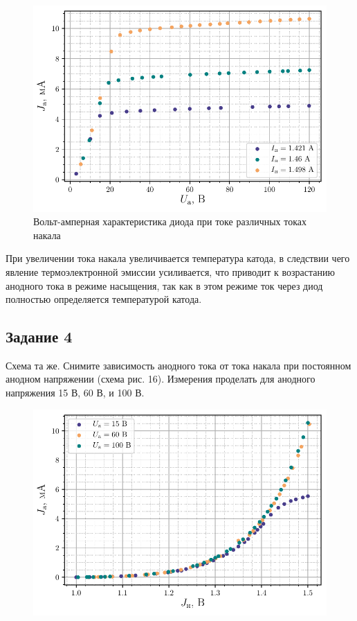 \begin{figure}[H]
	\centering
    \includegraphics[scale=1]{scripts/fig3}
	\caption{Вольт-амперная характеристика диода при токе различных токах
    накала}
	\label{fig:17}
\end{figure}

При увеличении тока накала увеличивается температура катода, в следствии чего явление термоэлектронной эмиссии усиливается, что приводит к возрастанию анодного тока в режиме насыщения, так как в этом режиме ток через диод полностью определяется температурой катода.

\subsection{Задание 4}
Схема та же. Снимите зависимость анодного тока от тока накала при постоянном анодном напряжении (схема рис. 16). Измерения проделать для анодного напряжения 15 В, 60 В, и 100 В.

\begin{figure}[H]
	\centering
    \includegraphics[width=0.85\linewidth]{scripts/fig4}
	\caption{}
	\label{fig:18}
\end{figure}


